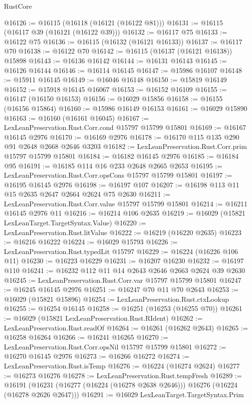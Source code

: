 \begin{lexlean}{RustCore}
\begin{coremodule}
@16126 := @16115 (@16118 (@16121 (@16122 @81)))
@16131 := @16115 (@16117 @39 (@16121 (@16122 @39)))
@16132 := @16117 @75
@16133 := @16122 @75
@16136 := @16115 (@16132 (@16121 @16133))
@16137 := @16117 @70
@16138 := @16122 @70
@16142 := @16115 (@16137 (@16121 @16138)) @15898
@16143 := @16136 @16142
@16144 := @16131 @16143
@16145 := @16126 @16144
@16146 := @16114 @16145
@16147 := @15986 @16107
@16148 := @15911 @16145
@16149 := @16046 @16148
@16150 := @15819 @16149
@16152 := @15918 @16145 @16067
@16153 := @16152 @16109
@16155 := @16147 (@16150 @16153)
@16156 := @16029 @15856
@16158 := @16155 (@16156 @15864)
@16160 := @15986 @16149 @16153
@16161 := @16029 @15890
@16163 := @16160 (@16161 @16045)
@16167 := LexLeanPreservation.Rust.Corr.cond @15797 @15799 @15801
@16169 := @16167 @16145 @2976
@16170 := @16169 @2976
@16178 := @16170 @115 @135 @290 @91 @2648 @2668 @2646 @3203
@16182 := LexLeanPreservation.Rust.Corr.prim @15797 @15799 @15801
@16184 := @16182 @16145 @2976
@16185 := @16184 @95
@16191 := @16185 @114 @16 @233 @2648 @2665 @2653
@16195 := LexLeanPreservation.Rust.Corr.opsCons @15797 @15799 @15801
@16197 := @16195 @16145 @2976
@16198 := @16197 @107
@16207 := @16198 @113 @11 @15 @2635 @2647 @2664 @2624 @75 @2630
@16211 := LexLeanPreservation.Rust.Corr.value @15797 @15799 @15801
@16214 := @16211 @16145 @2976 @11
@16216 := @16214 @106 @2635
@16219 := @16029 (@15821 LexLeanTarget.TargetSyntax.Value)
@16220 := LexLeanPreservation.Rust.litValue
@16222 := @16219 (@16220 @2635)
@16223 := @16216 @16222
@16224 := @16029 @15793
@16226 := LexLeanPreservation.Rust.typedLit @15797
@16229 := @16224 (@16226 @106 @11)
@16230 := @16223 @16229
@16231 := @16207 @16230
@16232 := @16197 @110
@16241 := @16232 @112 @11 @14 @2643 @2646 @2663 @2624 @39 @2630
@16245 := LexLeanPreservation.Rust.Corr.var @15797 @15799 @15801
@16247 := @16245 @16145 @2976
@16251 := @16247 @70 @11 @70 @2643
@16253 := @16029 (@15821 @15896)
@16254 := LexLeanPreservation.Rust.ctxLookup
@16255 := @16254 @16145
@16258 := @16251 (@16253 (@16255 @70))
@16261 := @16029 (@15821 LexLeanPreservation.Rust.RIdent)
@16262 := LexLeanPreservation.Rust.readOf
@16264 := @16261 (@16262 @2643)
@16265 := @16258 @16264
@16266 := @16241 @16265
@16270 := LexLeanPreservation.Rust.Corr.opsNil @15797 @15799 @15801
@16272 := @16270 @16145 @2976
@16273 := @16266 @16272
@16274 := LexLeanPreservation.Rust.isTemp
@16276 := @16224 (@16274 @2624)
@16277 := @16273 @16276
@16278 := LexLeanPreservation.Rust.tempFresh
@16289 := @16191
    (@16231 (@16277 (@16224 (@16278 @2638 @2646))) @16276 (@16224 (@16278 @2626 @2647)))
@16291 := @16029 LexLeanTarget.TargetSyntax.Prim

\end{coremodule}
\end{lexlean}
